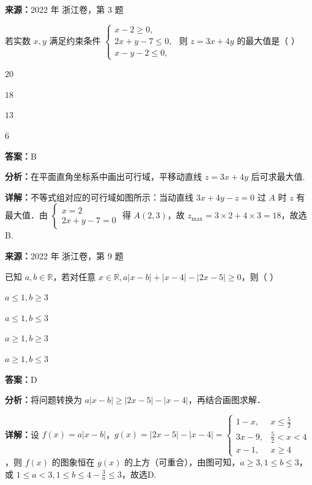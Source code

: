 \begin{question}[points=4]
\textbf{来源：}2022 年 浙江卷，第 3 题\par
若实数 $x,y$ 满足约束条件 $\begin{cases} x-2 \ge 0, \\ 2x+y-7 \le 0, \\ x-y-2 \le 0, \end{cases}$ 则 $z = 3x+4y$ 的最大值是（ ）
\begin{choices}
  \item $20$
  \item $18$
  \item $13$
  \item $6$
\end{choices}
\begin{solution}
\textbf{答案：}B

\textbf{分析：}在平面直角坐标系中画出可行域，平移动直线 $z=3x+4y$ 后可求最大值.

\textbf{详解：}不等式组对应的可行域如图所示：当动直线 $3x+4y-z=0$ 过 $A$ 时 $z$ 有最大值．由 $\begin{cases} x=2 \\ 2x+y-7=0 \end{cases}$ 得 $A(2,3)$，故 $z_{\max}=3\times2+4\times3=18$，故选B.
\end{solution}
\end{question}

\begin{question}[points=4]
\textbf{来源：}2022 年 浙江卷，第 9 题\par
已知 $a,b \in \mathbb{R}$，若对任意 $x \in \mathbb{R}, a|x-b| + |x-4| - |2x-5| \ge 0$，则（ ）
\begin{choices}
  \item $a \le 1, b \ge 3$
  \item $a \le 1, b \le 3$
  \item $a \ge 1, b \ge 3$
  \item $a \ge 1, b \le 3$
\end{choices}
\begin{solution}
\textbf{答案：}D

\textbf{分析：}将问题转换为 $a|x-b| \ge |2x-5| - |x-4|$，再结合画图求解．

\textbf{详解：}设 $f(x)=a|x-b|$，$g(x)=|2x-5|-|x-4| = \begin{cases} 1-x, & x \le \frac{5}{2} \\ 3x-9, & \frac{5}{2} < x < 4 \\ x-1, & x \ge 4 \end{cases}$，则 $f(x)$ 的图象恒在 $g(x)$ 的上方（可重合），由图可知，$a \ge 3, 1 \le b \le 3$，或 $1 \le a < 3, 1 \le b \le 4-\frac{3}{a} \le 3$，故选D.
\end{solution}
\end{question}

